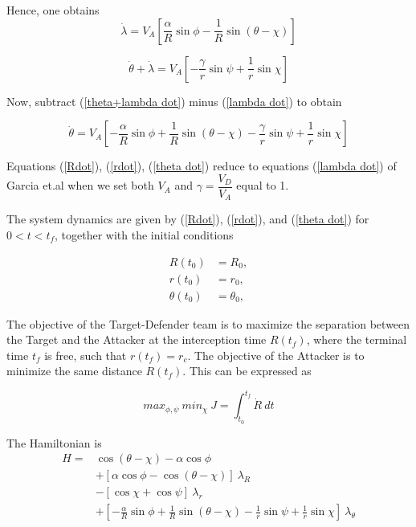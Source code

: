 Hence, one obtains 
\begin{equation}
\dot{\lambda} = V_A [\dfrac{\alpha}{R} \sin \phi - \dfrac{1}{R} \sin (\theta - \chi)]
\label{lambda dot}
\end{equation}

\begin{equation}
\dot{\theta} + \dot{\lambda} = V_A [-\dfrac{\gamma}{r}\sin \psi + \dfrac{1}{r} \sin \chi]
\label{theta+lambda dot}
\end{equation}

Now, subtract (\ref{theta+lambda dot}) minus (\ref{lambda dot}) to obtain

\begin{equation}
\dot{\theta} = V_A [- \dfrac{\alpha}{R} \sin \phi + \dfrac{1}{R} \sin(\theta - \chi) - \dfrac{\gamma}{r} \sin \psi + \dfrac{1}{r}\sin \chi]
\label{theta dot}
\end{equation} 

Equations (\ref{Rdot}), (\ref{rdot}), (\ref{theta dot}) reduce to equations (\ref{lambda dot}) of Garcia et.al \cite{pachter2014active} when we set both $V_A$ and $\gamma=\dfrac{V_D}{V_A}$ equal to 1. 

The system dynamics are given by (\ref{Rdot}), (\ref{rdot}), and (\ref{theta dot}) for $0< t < t_f$, together with the initial conditions 

\begin{equation*}
	\begin{split}
		R(t_0)&=R_0,\\
		r(t_0)&= r_0,\\
		\theta(t_0)&=\theta_0,
	\end{split}
\end{equation*}

The objective of the Target-Defender team is to maximize
the separation between the Target and the Attacker at the
interception time $R(t_f)$, where the terminal time $t_f$ is free,
such that $r(t_f) = r_c$. The objective of the Attacker is to
minimize the same distance $R(t_f)$. This can be expressed as

\begin{equation*}
max_{\phi,\psi}\ min_\chi\ J= \int_{t_0}^{t_f} \dot{R}\ dt
\end{equation*}

The Hamiltonian is
\begin{equation}
	\begin{split}
	H = & \cos(\theta - \chi) - \alpha \cos \phi \\
	& + [\alpha \cos \phi  - \cos (\theta - \chi)]\ \lambda_R \\
	& - [\cos\chi + \cos\psi]\ \lambda_r \\
	& + [-\frac{\alpha}{R}\sin\phi 
	+\frac{1}{R}\sin(\theta - \chi )
	-\frac{1}{r} \sin \psi
	+\frac{1}{r} \sin \chi]\ \lambda_\theta
	\end{split}
	\label{Hamiltonian}
\end{equation}


